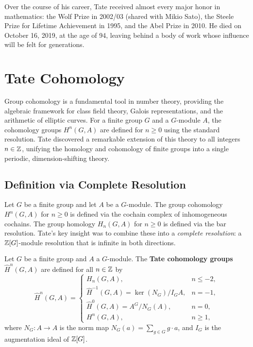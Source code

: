 Over the course of his career, Tate received almost every major honor in mathematics: the Wolf Prize in 2002/03 (shared with Mikio Sato), the Steele Prize for Lifetime Achievement in 1995, and the Abel Prize in 2010. He died on October 16, 2019, at the age of 94, leaving behind a body of work whose influence will be felt for generations.

\section{Tate Cohomology}

Group cohomology is a fundamental tool in number theory, providing the algebraic framework for class field theory, Galois representations, and the arithmetic of elliptic curves. For a finite group \(G\) and a \(G\)-module \(A\), the cohomology groups \(H^n(G,A)\) are defined for \(n \geq 0\) using the standard resolution. Tate discovered a remarkable extension of this theory to all integers \(n \in \mathbb{Z}\), unifying the homology and cohomology of finite groups into a single periodic, dimension-shifting theory.

\subsection{Definition via Complete Resolution}

Let \(G\) be a finite group and let \(A\) be a \(G\)-module. The group cohomology \(H^n(G,A)\) for \(n \geq 0\) is defined via the cochain complex of inhomogeneous cochains. The group homology \(H_n(G,A)\) for \(n \geq 0\) is defined via the bar resolution. Tate's key insight was to combine these into a \textit{complete resolution}: a \(\mathbb{Z}[G]\)-module resolution that is infinite in both directions.

\begin{definition}
Let \(G\) be a finite group and \(A\) a \(G\)-module. The \textbf{Tate cohomology groups} \(\widehat{H}^n(G,A)\) are defined for all \(n \in \mathbb{Z}\) by
\[
\widehat{H}^n(G,A) =
\begin{cases}
H_n(G,A), & n \leq -2, \\[4pt]
\widehat{H}^{-1}(G,A) = \ker(N_G)/I_G A, & n = -1, \\[4pt]
\widehat{H}^{0}(G,A) = A^G / N_G(A), & n = 0, \\[4pt]
H^n(G,A), & n \geq 1,
\end{cases}
\]
where \(N_G: A \to A\) is the norm map \(N_G(a) = \sum_{g \in G} g \cdot a\), and \(I_G\) is the augmentation ideal of \(\mathbb{Z}[G]\).
\end{definition}

